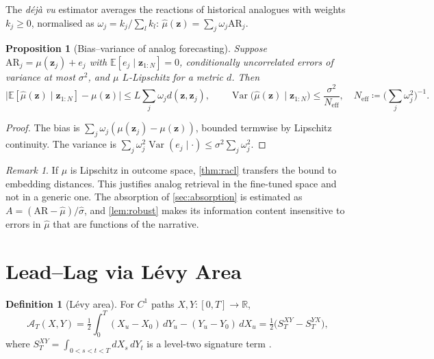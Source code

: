 \documentclass[11pt,a4paper]{article}
\theoremstyle{plain}
\newtheorem{proposition}[theorem]{Proposition}
\theoremstyle{definition}
\newtheorem{definition}[theorem]{Definition}
\theoremstyle{remark}
\newtheorem{remark}[theorem]{Remark}
\newcommand{\R}{\mathbb{R}}
\newcommand{\E}{\mathbb{E}}
\newcommand{\z}{\bm{z}}
\DeclareMathOperator{\Var}{Var}
\begin{document}
The \emph{d\'ej\`a vu} estimator averages the reactions of historical analogues with weights $k_j\ge0$, normalised as $\omega_j=k_j/\sum_lk_l$: $\hat\mu(\z)=\sum_j\omega_j\mathrm{AR}_j$.

\begin{proposition}[Bias--variance of analog forecasting]\label{prop:analog}
Suppose $\mathrm{AR}_j=\mu(\z_j)+e_j$ with $\E[e_j\mid\z_{1:N}]=0$, conditionally uncorrelated errors of variance at most $\sigma^2$, and $\mu$ $L$-Lipschitz for a metric $d$. Then
\[
  \big|\E[\hat\mu(\z)\mid\z_{1:N}]-\mu(\z)\big|\le L\sum_j\omega_jd(\z,\z_j),\qquad
  \Var\big(\hat\mu(\z)\mid\z_{1:N}\big)\le\frac{\sigma^2}{N_{\text{eff}}},\quad N_{\text{eff}}\coloneqq\Big(\sum_j\omega_j^2\Big)^{-1}.
\]
\end{proposition}
\begin{proof}
The bias is $\sum_j\omega_j(\mu(\z_j)-\mu(\z))$, bounded termwise by Lipschitz continuity. The variance is $\sum_j\omega_j^2\Var(e_j\mid\cdot)\le\sigma^2\sum_j\omega_j^2$.
\end{proof}

\begin{remark}
If $\mu$ is Lipschitz in outcome space, \cref{thm:racl} transfers the bound to embedding distances. This justifies analog retrieval in the fine-tuned space and not in a generic one. The absorption of \cref{sec:absorption} is estimated as $A=(\mathrm{AR}-\hat\mu)/\hat\sigma$, and \cref{lem:robust} makes its information content insensitive to errors in $\hat\mu$ that are functions of the narrative.
\end{remark}

\section{Lead--Lag via L\'evy Area}\label{sec:leadlag}

\begin{definition}[L\'evy area]
For $C^1$ paths $X,Y:[0,T]\to\R$,
\[
  \mathcal{A}_T(X,Y)=\tfrac12\int_0^T(X_u-X_0)\,dY_u-(Y_u-Y_0)\,dX_u=\tfrac12\big(S^{XY}_T-S^{YX}_T\big),
\]
where $S^{XY}_T=\int_{0<s<t<T}dX_s\,dY_t$ is a level-two signature term \citep{lyons1998,chevyrev2016}.
\end{definition}
\end{document}
